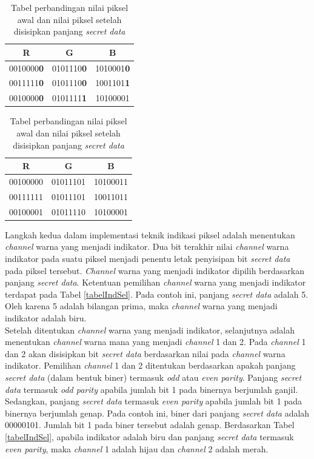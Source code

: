 \documentclass[a4paper,twoside]{article}
\begin{document}
\begin{enumerate}
\begin{itemize}
		\begin{table}[!htbp]
		\centering
		\caption{Tabel perbandingan nilai piksel awal dan nilai piksel setelah disisipkan panjang \textit{secret data}}
		\label{TabelStoreSize}
		\begin{tabular}{| c | c | c |}
		\hline
		R & G & B\\
		\hline
		0010000\textbf{0} & 0101110\textbf{0} & 1010001\textbf{0}\\
		\hline
		0011111\textbf{0} & 0101110\textbf{0} & 1001101\textbf{1}\\
		\hline
		0010000\textbf{0} & 0101111\textbf{1} & 10100001\\
		\hline
		\end{tabular}
		\quad
		\begin{tabular}{| c | c | c |}
		\hline
		R & G & B\\
		\hline
		00100000 & 01011101 & 10100011\\
		\hline
		00111111 & 01011101 & 10011011\\
		\hline
		00100001 & 01011110 & 10100001\\
		\hline
		\end{tabular}		
		\end{table}
		
		Langkah kedua dalam implementasi teknik indikasi piksel adalah menentukan \textit{channel} warna yang menjadi indikator. Dua bit terakhir nilai \textit{channel} warna indikator pada suatu piksel menjadi penentu letak penyisipan bit \textit{secret data} pada piksel tersebut. \textit{Channel} warna yang menjadi indikator dipilih berdasarkan panjang \textit{secret data}. Ketentuan pemilihan \textit{channel} warna yang menjadi indikator terdapat pada Tabel \ref{tabelIndSel}. Pada contoh ini, panjang \textit{secret data} adalah 5. Oleh karena 5 adalah bilangan prima, maka \textit{channel} warna yang menjadi indikator adalah biru.\\
		
		Setelah ditentukan \textit{channel} warna yang menjadi indikator, selanjutnya adalah menentukan \textit{channel} warna mana yang menjadi \textit{channel} 1 dan 2. Pada \textit{channel} 1 dan 2 akan disisipkan bit \textit{secret data} berdasarkan nilai pada \textit{channel} warna indikator. Pemilihan \textit{channel} 1 dan 2 ditentukan berdasarkan apakah panjang \textit{secret data} (dalam bentuk biner) termasuk \textit{odd} atau \textit{even parity}. Panjang \textit{secret data} termasuk \textit{odd parity} apabila jumlah bit 1 pada binernya berjumlah ganjil. Sedangkan, panjang \textit{secret data} termasuk \textit{even parity} apabila jumlah bit 1 pada binernya berjumlah genap. Pada contoh ini, biner dari panjang \textit{secret data} adalah 00000101. Jumlah bit 1 pada biner tersebut adalah genap. Berdasarkan Tabel \ref{tabelIndSel}, apabila indikator adalah biru dan panjang \textit{secret data} termasuk \textit{even parity}, maka \textit{channel} 1 adalah hijau dan \textit{channel} 2 adalah merah.\\	
		

\end{itemize}
\end{enumerate}
\end{document}
